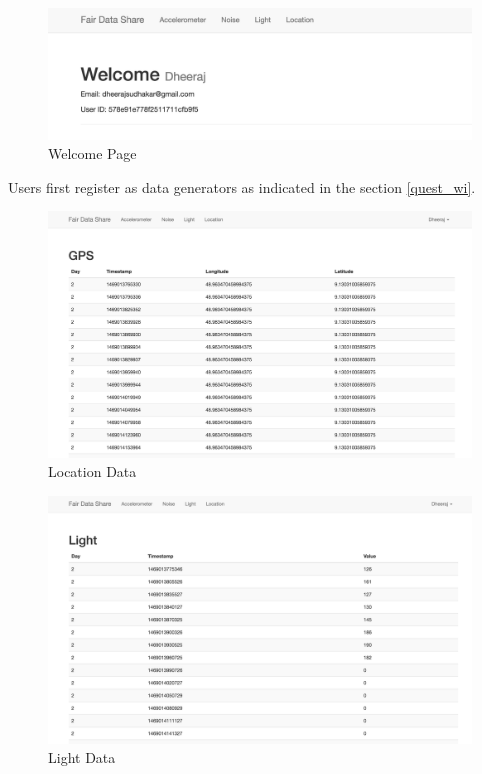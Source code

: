 \begin{figure}[ht!]
\centering
\includegraphics[width=\textwidth,keepaspectratio]{./images/fds_user_welcome}
\caption{Welcome Page\label{fig:fdsdash}}
\end{figure}

Users first register as data generators as indicated in the section \ref{quest_wi}.

\begin{figure}[ht!]
\centering
\includegraphics[width=\textwidth,keepaspectratio]{./images/fds_user_gps_full}
\caption{Location Data\label{fig:fdsgps}}
\end{figure}

\begin{figure}[ht!]
\centering
\includegraphics[width=\textwidth,keepaspectratio]{./images/fds_user_light_full}
\caption{Light Data \label{fig:fdslight}}
\end{figure}


